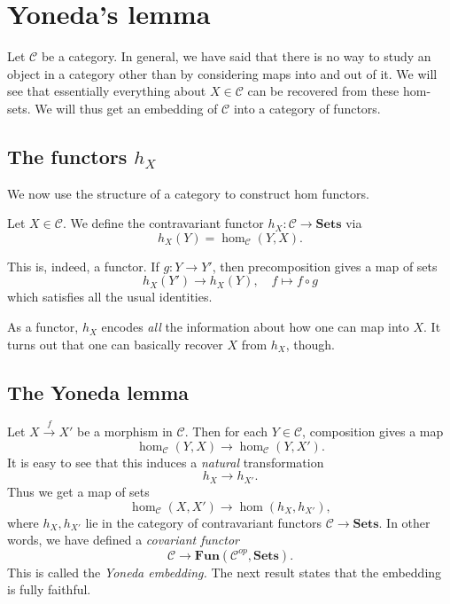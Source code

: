 \section{Yoneda's lemma}


Let $\mathcal{C}$ be a category.
In general, we have said that there is no way to study an object in  a
category other than by considering maps into and out of it.
We will see that essentially everything about $X \in \mathcal{C}$ can be
recovered from these hom-sets.
We will thus get an embedding of $\mathcal{C}$ into a category of functors.

\subsection{The functors $h_X$}

We now use the structure of a category to construct hom functors.
\begin{definition}
Let $X \in \mathcal{C}$. We define the contravariant functor $h_X: \mathcal{C}
\to \mathbf{Sets}$ via
\[ h_X(Y) = \hom_{\mathcal{C}}(Y, X).  \]
\end{definition}

This is, indeed, a functor. If $g: Y \to Y'$, then precomposition gives a map
of sets
\[ h_X(Y') \to h_X(Y),  \quad f \mapsto f \circ g \]
which satisfies all the usual identities.

As a functor, $h_X$ encodes \emph{all} the information about
how one can map into $X$.
It turns out that one can basically recover $X$ from $h_X$, though.

\subsection{The Yoneda lemma}

Let $X \stackrel{f}{\to} X'$ be a morphism in $\mathcal{C}$.
Then for each $Y \in \mathcal{C}$, composition gives a map
\[ \hom_{\mathcal{C}}(Y, X) \to \hom_{\mathcal{C}}(Y, X').  \]
It is easy to see that this induces a \emph{natural} transformation
\[ h_{X} \to h_{X'}.  \]
Thus we get a map of sets
\[ \hom_{\mathcal{C}}(X, X') \to \hom(h_X, h_{X'}),  \]
where $h_X, h_{X'}$ lie in the category of contravariant functors $\mathcal{C}
\to \mathbf{Sets}$.
In other words, we have defined a \emph{covariant functor}
\[ \mathcal{C} \to \mathbf{Fun}(\mathcal{C}^{op}, \mathbf{Sets}).  \]
This is called the \emph{Yoneda embedding.} The next result states that the
embedding is fully faithful.

